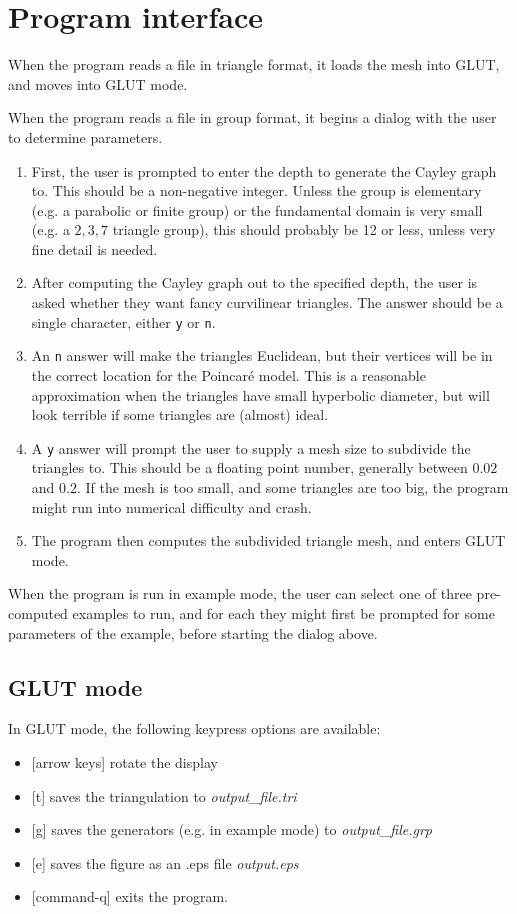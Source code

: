 \documentclass[12pt]{article}
\begin{document}
\section{Program interface}\label{section:interface}

When the program reads a file in triangle format, it loads the mesh into
GLUT, and moves into GLUT mode.

When the program reads a file in group format, it begins a dialog with the
user to determine parameters. 
\begin{enumerate}
\item{First, the user is prompted to enter the depth to generate the Cayley
graph to. This should be a non-negative integer.
Unless the group is elementary (e.g.\/ a parabolic or finite group)
or the fundamental domain is very small (e.g.\/ a $2,3,7$ triangle group), this
should probably be 12 or less, unless very fine detail is needed.}
\item{After computing the Cayley graph out to the specified depth, the user
is asked whether they want fancy curvilinear triangles. The answer should be
a single character, either {\tt y} or {\tt n}.}
\item{An {\tt n} answer will make the triangles Euclidean, but their vertices
will be in the correct location for the Poincar\'e model. This is a reasonable
approximation when the triangles have small hyperbolic diameter, but will look
terrible if some triangles are (almost) ideal.}
\item{A {\tt y} answer will prompt the user to supply a mesh size to subdivide
the triangles to. This should be a floating point number, generally between
$0.02$ and $0.2$. If the mesh is too small, and some triangles are too big, the
program might run into numerical difficulty and crash.}
\item{The program then computes the subdivided triangle mesh, and enters GLUT mode.}
\end{enumerate}

When the program is run in example mode, the user can select one of three
pre-computed examples to run, and for each they might first be prompted for
some parameters of the example, before starting the dialog above.

\subsection{GLUT mode}

In GLUT mode, the following keypress options are available:
\begin{itemize}
\item{[arrow keys] rotate the display}
\item{[t] saves the triangulation to {\sl output\_file.tri}}
\item{[g] saves the generators (e.g. in example mode) to {\sl output\_file.grp}}
\item{[e] saves the figure as an .eps file {\sl output.eps}}
\item{[command-q] exits the program.}
\end{itemize}
\end{document}
